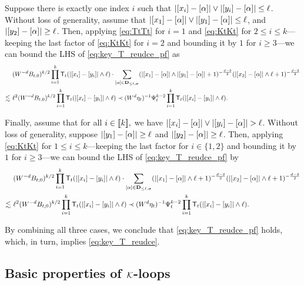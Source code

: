 \medskip
{} Suppose there is exactly one index $i$ such that $|[x_i]-[\al]|\vee|[y_i]-[\al]|\le \ell$.  
Without loss of generality, assume that $|[x_1]-[\al]|\vee|[y_1]-[\al]|\le \ell$, and $|[y_2]-[\al]|\ge \ell$. Then, applying \eqref{eq:TtTt} for $i=1$ and \eqref{eq:KtKt} for $2\le i \le k$---keeping the last factor of \eqref{eq:KtKt} for $i=2$ and bounding it by $1$ for $i\ge 3$---we can bound the LHS of \eqref{eq:key_T_reudce_pf} as
\begin{align*}
 &~(W^{-d}B_{t,0})^{k/2} \prod_{i=1}^{k} \sT_{t}(|[x_i]-[y_i]|\wedge \ell) \cdot \sum_{[\al]\in \bD_{\le \ell,\bsig}}  (|[x_1]-[\al]| \wedge |[y_1]-[\al]|+1)^{-\frac{d-2}{2}}(|[x_2]-[\al]| \wedge \ell +1)^{-\frac{d-2}{2}} \\
 \lesssim &~\ell^2 (W^{-d}B_{t,0})^{k/2} \prod_{i=1}^{k} \sT_{t}(|[x_i]-[y_i]|\wedge \ell) \prec (W^{d}\eta_t)^{-1} \Psi_t^{k-2} \prod_{i=1}^{k} \sT_{t}(|[x_i]-[y_i]|\wedge \ell) .
\end{align*}


\medskip
{} Finally, assume that for all $i\in\qqq{k},$ we have $|[x_i]-[\al]|\vee|[y_i]-[\al]|> \ell$. Without loss of generality, suppose $|[y_1]-[\al]|\ge \ell$ and $|[y_2]-[\al]|\ge \ell$. Then, applying \eqref{eq:KtKt} for $1\le i \le k$---keeping the last factor for $i\in\{1,2\}$ and bounding it by $1$ for $i\ge 3$---we can bound the LHS of \eqref{eq:key_T_reudce_pf} by 
\begin{align*}
 &~(W^{-d}B_{t,0})^{k/2} \prod_{i=1}^{k} \sT_{t}(|[x_i]-[y_i]|\wedge \ell) \cdot \sum_{[\al]\in \bD_{\le \ell,\bsig}}  (|[x_1]-[\al]| \wedge \ell+1)^{-\frac{d-2}{2}}(|[x_2]-[\al]| \wedge \ell +1)^{-\frac{d-2}{2}} \\
 \lesssim &~\ell^2 (W^{-d}B_{t,0})^{k/2} \prod_{i=1}^{k} \sT_{t}(|[x_i]-[y_i]|\wedge \ell) \prec (W^{d}\eta_t)^{-1} \Psi_t^{k-2} \prod_{i=1}^{k} \sT_{t}(|[x_i]-[y_i]|\wedge \ell) .
\end{align*}

\medskip

By combining all three cases, we conclude that \eqref{eq:key_T_reudce_pf} holds, which, in turn, implies \eqref{eq:key_T_reudce}.

\subsection{Basic properties of  \texorpdfstring{$\cal K$}{K}-loops}\label{Sec:CalK}


